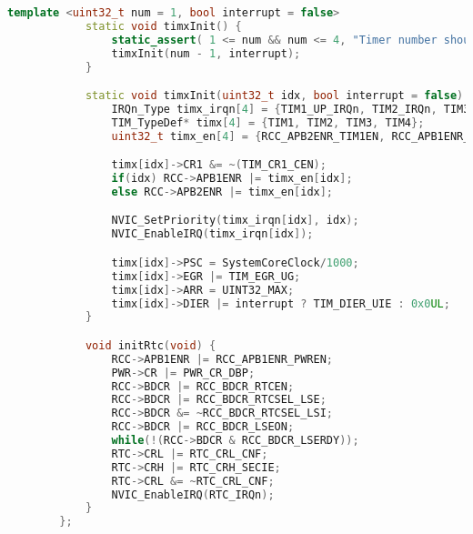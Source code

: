 \begin{latin}
\begin{lstlisting}[language=c++, caption={MCU tool functions}]
			template <uint32_t num = 1, bool interrupt = false>
			static void timxInit() {
				static_assert( 1 <= num && num <= 4, "Timer number should be between 1 and 4");
				timxInit(num - 1, interrupt);
			}

			static void timxInit(uint32_t idx, bool interrupt = false) {
				IRQn_Type timx_irqn[4] = {TIM1_UP_IRQn, TIM2_IRQn, TIM3_IRQn, TIM4_IRQn};
				TIM_TypeDef* timx[4] = {TIM1, TIM2, TIM3, TIM4};
				uint32_t timx_en[4] = {RCC_APB2ENR_TIM1EN, RCC_APB1ENR_TIM2EN, RCC_APB1ENR_TIM3EN, RCC_APB1ENR_TIM4EN};

				timx[idx]->CR1 &= ~(TIM_CR1_CEN);
				if(idx) RCC->APB1ENR |= timx_en[idx];
				else RCC->APB2ENR |= timx_en[idx];

				NVIC_SetPriority(timx_irqn[idx], idx);
				NVIC_EnableIRQ(timx_irqn[idx]);

				timx[idx]->PSC = SystemCoreClock/1000;
				timx[idx]->EGR |= TIM_EGR_UG;
				timx[idx]->ARR = UINT32_MAX;
				timx[idx]->DIER |= interrupt ? TIM_DIER_UIE : 0x0UL;
			}

			void initRtc(void) {
				RCC->APB1ENR |= RCC_APB1ENR_PWREN;
				PWR->CR |= PWR_CR_DBP;
				RCC->BDCR |= RCC_BDCR_RTCEN;
				RCC->BDCR |= RCC_BDCR_RTCSEL_LSE;
				RCC->BDCR &= ~RCC_BDCR_RTCSEL_LSI;
				RCC->BDCR |= RCC_BDCR_LSEON;
				while(!(RCC->BDCR & RCC_BDCR_LSERDY));
				RTC->CRL |= RTC_CRL_CNF;
				RTC->CRH |= RTC_CRH_SECIE;
				RTC->CRL &= ~RTC_CRL_CNF;
				NVIC_EnableIRQ(RTC_IRQn);
			}
		};
	\end{lstlisting}
\end{latin}
